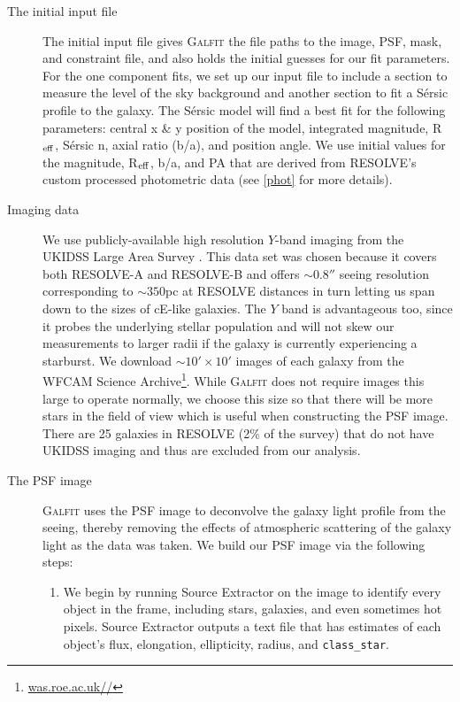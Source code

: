 \documentclass[iop,apj]{emulateapj}
\newcommand{\Reff}{R$_{\rm eff}$}
\begin{document}
\begin{description}

\item[The initial input file]{The initial input file gives \textsc{Galfit} the file paths to the image, PSF, mask, and constraint file, and also holds the initial guesses for our fit parameters. For the one component fits, we set up our input file to include a section to measure the level of the sky background and another section to fit a S\'ersic profile \citep{Sersic1963, Sersic1968} to the galaxy. The S\'ersic model will find a best fit for the following parameters: central x \& y position of the model, integrated magnitude, \Reff, S\'ersic n, axial ratio (b/a), and position angle. We use initial values for the magnitude, \Reff, b/a, and PA that are derived from RESOLVE's custom processed photometric data (see \autoref{phot} for more details).}

\item[Imaging data]{We use publicly-available high resolution $Y$-band imaging from the UKIDSS Large Area Survey \citep{Lawrence2007}. This data set was chosen because it covers both RESOLVE-A and RESOLVE-B and offers $\sim0.8''$ seeing resolution corresponding to $\sim350$pc at RESOLVE distances in turn letting us span down to the sizes of cE-like galaxies. The $Y$ band is advantageous too, since it probes the underlying stellar population and will not skew our measurements to larger radii if the galaxy is currently experiencing a starburst. We download $\sim10'\times10'$ images of each galaxy from the WFCAM Science Archive\footnote{\url{was.roe.ac.uk//}}}. While \textsc{Galfit} does not require images this large to operate normally, we choose this size so that there will be more stars in the field of view which is useful when constructing the PSF image. There are 25 galaxies in RESOLVE (2\% of the survey) that do not have UKIDSS imaging and thus are excluded from our analysis.

\item[The PSF image]{\textsc{Galfit} uses the PSF image to deconvolve the galaxy light profile from the seeing, thereby removing the effects of atmospheric scattering of the galaxy light as the data was taken. We build our PSF image via the following steps:

\begin{enumerate}

\item We begin by running Source Extractor on the image to identify every object in the frame, including stars, galaxies, and even sometimes hot pixels. Source Extractor outputs a text file that has estimates of each object's flux, elongation, ellipticity, radius, and \texttt{class\_star}.


\end{enumerate}}
\end{description}
\end{document}

